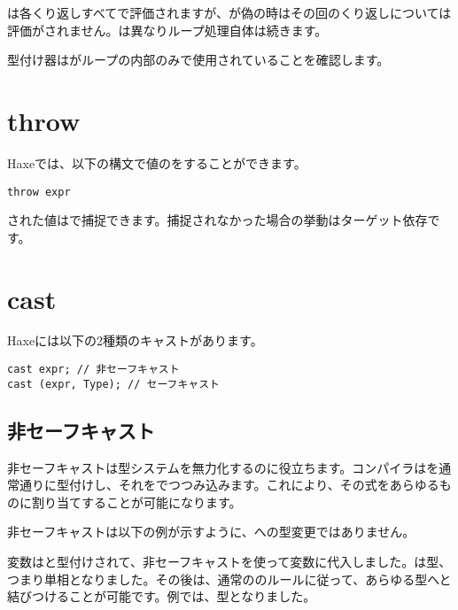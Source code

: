 は各くり返しすべてで評価されますが、が偽の時はその回のくり返しについては評価がされません。は異なりループ処理自体は続きます。

型付け器はがループの内部のみで使用されていることを確認します。

\section{throw}
\label{expression-throw}

Haxeでは、以下の構文で値のをすることができます。

\begin{lstlisting}
throw expr
\end{lstlisting}

された値はで捕捉できます。捕捉されなかった場合の挙動はターゲット依存です。

\section{cast}
\label{expression-cast}

Haxeには以下の2種類のキャストがあります。

\begin{lstlisting}
cast expr; // 非セーフキャスト
cast (expr, Type); // セーフキャスト
\end{lstlisting}

\subsection{非セーフキャスト}
\label{expression-cast-unsafe}

非セーフキャストは型システムを無力化するのに役立ちます。コンパイラはを通常通りに型付けし、それをでつつみ込みます。これにより、その式をあらゆるものに割り当てすることが可能になります。

非セーフキャストは以下の例が示すように、への型変更ではありません。


変数はと型付けされて、非セーフキャストを使って変数に代入しました。は型、つまり単相となりました。その後は、通常ののルールに従って、あらゆる型へと結びつけることが可能です。例では、型となりました。

